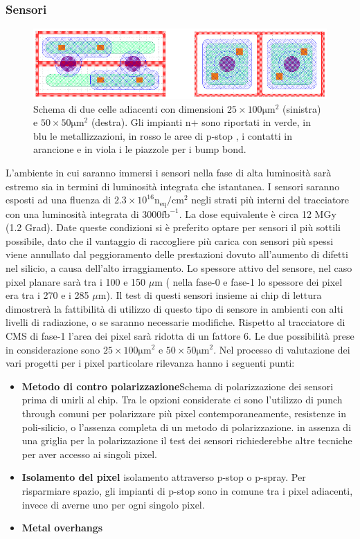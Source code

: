 \subsubsection{Sensori}
\begin{figure}
\centering
\includegraphics[scale=0.35]{Immagini/Sensors}
\caption{Schema di due celle adiacenti con dimensioni $\mathrm{25 \times 100 \mu m^2}$ (sinistra) e $\mathrm{50 \times 50\mu m^2}$ (destra). Gli impianti n+ sono riportati in verde, in blu le metallizzazioni, in rosso le aree di p-stop , i contatti in arancione e in viola i le piazzole per i bump bond.}
\label{Sensors}
\end{figure}
L'ambiente in cui saranno immersi i sensori nella fase di alta luminosità sarà estremo sia in termini di luminosità integrata che istantanea. 
I sensori saranno esposti ad una fluenza di  $2.3 \times 10^{16} \mathrm{n_{eq}/cm^2}$ negli strati più interni del tracciatore con una luminosità integrata di 3000$\mathrm{fb^{-1}}$. La dose equivalente è circa 12 MGy (1.2 Grad). 
Date queste condizioni si è preferito optare per sensori il più sottili possibile, dato che il vantaggio di raccogliere più carica con sensori più spessi viene annullato dal peggioramento delle prestazioni dovuto all'aumento di difetti nel silicio, a causa dell'alto irraggiamento. 
Lo spessore attivo del sensore, nel caso pixel planare sarà tra i 100 e 150 $\mu$m ( nella fase-0 e fase-1 lo spessore dei pixel era tra i 270  e i 285 $\mu$m). 
Il test di questi sensori insieme ai chip di lettura dimostrerà la fattibilità di utilizzo di questo tipo di sensore in ambienti con alti livelli di radiazione, o se saranno necessarie modifiche. 
Rispetto al tracciatore di CMS di fase-1 l'area dei pixel sarà ridotta di un fattore 6. Le due possibilità prese in considerazione sono $\mathrm{25 \times 100 \mu m^2}$ e  $\mathrm{50 \times 50 \mu m^2}$. 
Nel processo di valutazione dei vari progetti per i pixel particolare rilevanza hanno i seguenti punti:
\begin{itemize}
\item \textbf{Metodo di contro polarizzazione}Schema di polarizzazione dei sensori prima di unirli al chip. Tra le opzioni considerate ci sono l'utilizzo di punch through comuni per polarizzare più pixel contemporaneamente, resistenze in poli-silicio, o l'assenza completa di un metodo di polarizzazione. in assenza di una griglia per la polarizzazione il test dei sensori richiederebbe altre tecniche per aver accesso ai singoli pixel. 

\item \textbf{Isolamento del pixel} isolamento attraverso p-stop o p-spray. Per risparmiare spazio, gli impianti di p-stop sono in comune tra i pixel adiacenti, invece di averne uno per ogni singolo pixel.
\item \textbf{Metal overhangs}
\end{itemize}

